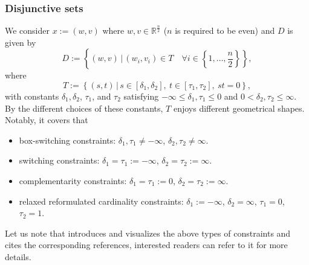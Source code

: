 \documentclass[11pt,a4paper,reqno]{amsart}
\begin{document}
{\subsubsection{Disjunctive sets}
We consider $x:=(w,v)$ where $w,v\in \mathbb R^{\frac{n}{2}}$ ($n$ is required to be even) and $D$ is given by
\begin{equation}\label{Eq:disjuncD}
    D:=\left\{(w,v)\,\big|\, (w_i, v_i) \in T \quad \forall i\in \left\{1, \ldots, \frac{n}{2}\right\}\right\},
\end{equation}
where
\begin{equation}\label{Eq:T}
    T:=\left\{(s,t) \,\big|\, s\in [\delta_1, \delta_2], \ t\in [\tau_1, \tau_2], \ st=0 \right\},
\end{equation}
with constants $\delta_1, \delta_2$, $\tau_1$, and $\tau_2$ satisfying $-\infty \leq \delta_1, \tau_1 \leq 0$ and $0 < \delta_2, \tau_2 \leq \infty$. 
By the different choices of these constants, $T$ enjoys different geometrical shapes. Notably, it covers that
\begin{itemize}[noitemsep, topsep=6pt]
    \item box-switching constraints: $\delta_1, \tau_1 \neq -\infty$, $\delta_2, \tau_2 \neq \infty$.
    \item switching constraints: $\delta_1=\tau_1:=-\infty$, $\delta_2=\tau_2:=\infty$.
    \item complementarity constraints: $\delta_1=\tau_1:=0$, $\delta_2=\tau_2:=\infty$.
    \item relaxed reformulated cardinality constraints: $\delta_1:=-\infty$, $\delta_2=\infty$, $\tau_1=0$, $\tau_2=1$.
\end{itemize}
Let us note that \cite[Section~5.1]{jia2023augmented} introduces and visualizes the above types of constraints and cites the corresponding references, interested readers can refer to it for more details. 

}
\end{document}
